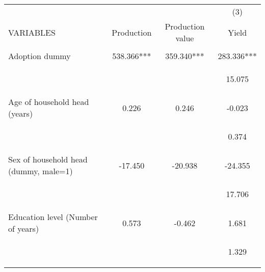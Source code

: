 \begin{center}
\begin{tabular}{lccc} \hline
 &  &  & (3) \\
VARIABLES & Production & Production value & Yield \\ \hline
\vspace{4pt} & \begin{footnotesize}\end{footnotesize} & \begin{footnotesize}\end{footnotesize} & \begin{footnotesize}\end{footnotesize} \\
Adoption dummy & 538.366*** & 359.340*** & 283.336*** \\
\vspace{4pt} & \begin{footnotesize}\end{footnotesize} & \begin{footnotesize}\end{footnotesize} & \begin{footnotesize}15.075\end{footnotesize} \\
Age of household head (years) & 0.226 & 0.246 & -0.023 \\
\vspace{4pt} & \begin{footnotesize}\end{footnotesize} & \begin{footnotesize}\end{footnotesize} & \begin{footnotesize}0.374\end{footnotesize} \\
Sex of household head (dummy, male=1) & -17.450 & -20.938 & -24.355 \\
\vspace{4pt} & \begin{footnotesize}\end{footnotesize} & \begin{footnotesize}\end{footnotesize} & \begin{footnotesize}17.706\end{footnotesize} \\
Education level (Number of years) & 0.573 & -0.462 & 1.681 \\
\vspace{4pt} & \begin{footnotesize}\end{footnotesize} & \begin{footnotesize}\end{footnotesize} & \begin{footnotesize}1.329\end{footnotesize} \\

\end{tabular}
\end{center}

